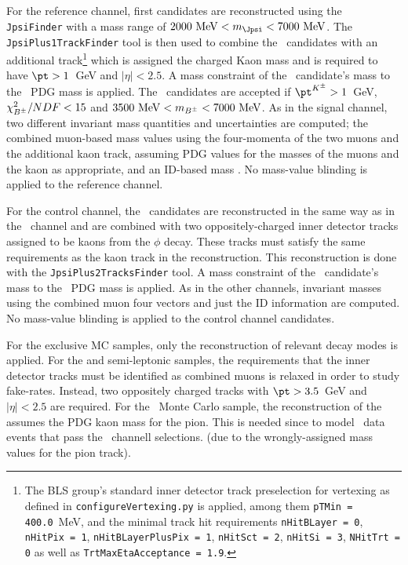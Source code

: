 For the \BpmKpmJpsi reference channel, first \JpsiMuMu candidates are reconstructed using the \texttt{JpsiFinder} with a mass range of $2000~\mathrm{MeV} < m_{\Jpsi} < 7000~\mathrm{MeV}$.
The \texttt{JpsiPlus1TrackFinder} tool is then used to combine the \Jpsi\ 
candidates with an additional track\footnote{
  The BLS group's standard inner detector track preselection
  for vertexing as defined in \texttt{configureVertexing.py} is applied, among
  them 
  \texttt{pTMin = 400.0}~MeV,
  and the minimal track hit requirements
  \texttt{nHitBLayer = 0}, 
  \texttt{nHitPix = 1},
  \texttt{nHitBLayerPlusPix = 1},
  \texttt{nHitSct = 2},
  \texttt{nHitSi = 3},
  \texttt{NHitTrt = 0} 
  as well as
  \texttt{TrtMaxEtaAcceptance = 1.9}.
}
which is assigned the charged Kaon mass and is required to have  
$\pt > 1$~GeV and $|\eta| < 2.5$.
A mass constraint of the \Jpsi\ candidate's mass to the \Jpsi\ PDG mass is applied. 
The \Bpm\ candidates are accepted if $\pt^{K^\pm} > 1$~GeV, $\chi^2_{B^\pm}/NDF < 15$ and $3500~\mathrm{MeV} < m_{B^\pm} < 7000~\mathrm{MeV}$.
As in the signal channel, two different invariant mass quantities and uncertainties are computed; 
the combined muon-based mass values \mucalcmassBpm using the four-momenta of the two muons and the additional kaon
track, assuming PDG values for the masses of the muons and the kaon
as appropriate, and an ID-based mass \muvtxmassBpm.    
No mass-value blinding is applied to the reference channel. 

For the \BsJpsiPhi control channel, the \Jpsi\ candidates are reconstructed in the same way as in the \BpmKpmJpsi\ channel and are combined with two oppositely-charged inner detector tracks assigned to be kaons from the $\phi$ decay. 
These tracks must satisfy the same requirements as the kaon track in the \BpmKpmJpsi reconstruction. 
This reconstruction is done with the \texttt{JpsiPlus2TracksFinder} tool. 
A mass constraint of the \Jpsi\ candidate's mass to the \Jpsi\ PDG mass is applied.
As in the other channels, invariant masses using the combined muon four vectors and just the ID information are computed.  
No mass-value blinding is applied to the control channel candidates.


For the exclusive MC samples, only the reconstruction of relevant decay modes is applied.  
For the \Bhh and semi-leptonic samples, the requirements that the inner detector tracks must be identified as combined muons is relaxed in order to study fake-rates.  
Instead, two oppositely charged tracks with $\pt > 3.5$~GeV and $|\eta| < 2.5$ are required.
\textred{DJ: Semi lep do we require one real muon?}
For the \BpPipJpsi\ Monte Carlo sample, the reconstruction of the \Bpm assumes 
the PDG kaon mass for the pion.  %
This is needed since to model \BpPipJpsi\ data events that pass the  \BpmKpmJpsi\ channell selections. 
(due to the wrongly-assigned mass values for the pion track).

